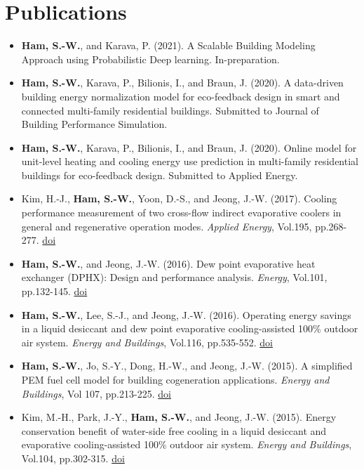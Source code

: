 \documentclass{resume}
\begin{document}
\section{Publications}
\begin{itemize}\setlength\itemsep{0.5em}\setlength\itemindent{-.1in}
\item{\textbf{Ham, S.-W.}, and Karava, P. (2021). A Scalable Building Modeling Approach using Probabilistic Deep learning. In-preparation.}
\item{\textbf{Ham, S.-W.}, Karava, P., Bilionis, I., and Braun, J. (2020). A data-driven building energy normalization model for eco-feedback design in smart and connected multi-family residential buildings. Submitted to Journal of Building Performance Simulation.}
\item{\textbf{Ham, S.-W.}, Karava, P., Bilionis, I., and Braun, J. (2020). Online model for unit-level heating and cooling energy use prediction in multi-family residential buildings for eco-feedback design. Submitted to Applied Energy.}
\item{Kim, H.-J., \textbf{Ham, S.-W.}, Yoon, D.-S., and Jeong, J.-W. (2017). Cooling performance measurement of two cross-flow indirect evaporative coolers in general and regenerative operation modes. \textit{Applied Energy},  Vol.195, pp.268-277. \href{https://doi.org/10.1016/j.apenergy.2017.03.053}{doi}}
\item{\textbf{Ham, S.-W.}, and Jeong, J.-W. (2016). Dew point evaporative heat exchanger (DPHX): Design and performance analysis. \textit{Energy}, Vol.101, pp.132-145. \href{https://doi.org/10.1016/j.energy.2016.02.019}{doi}}
\item{\textbf{Ham, S.-W.}, Lee, S.-J., and Jeong, J.-W. (2016). Operating energy savings in a liquid desiccant and dew point evaporative cooling-assisted 100\% outdoor air system. \textit{Energy and Buildings}, Vol.116, pp.535-552. \href{https://doi.org/10.1016/j.enbuild.2016.02.011}{doi}}
\item{\textbf{Ham, S.-W.}, Jo, S.-Y., Dong, H.-W., and Jeong, J.-W. (2015). A simplified PEM fuel cell model for building cogeneration applications. \textit{Energy and Buildings}, Vol 107, pp.213-225. \href{https://doi.org/10.1016/j.enbuild.2015.08.023}{doi}}
\item{Kim, M.-H., Park, J.-Y., \textbf{Ham, S.-W.}, and Jeong, J.-W. (2015). Energy conservation benefit of water-side free cooling in a liquid desiccant and evaporative cooling-assisted 100\% outdoor air system. \textit{Energy and Buildings},  Vol.104, pp.302-315. \href{https://doi.org/10.1016/j.enbuild.2015.07.029}{doi}}

\end{itemize}
\end{document}
